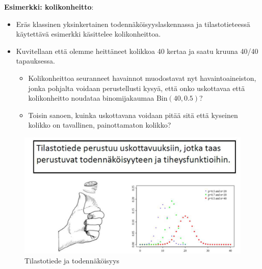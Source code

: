 \documentclass[
]{book}
\providecommand{\tightlist}{%
  \setlength{\itemsep}{0pt}\setlength{\parskip}{0pt}}
\begin{document}
\begin{eblock}{}

\textbf{Esimerkki: kolikonheitto}:

\begin{itemize}
\tightlist
\item
  Eräs klassinen yksinkertainen todennäköisyyslaskennassa ja tilastotieteessä käytettävä esimerkki käsittelee kolikonheittoa.
\item
  Kuvitellaan että olemme heittäneet kolikkoa 40 kertaa ja saatu kruuna 40/40 tapauksessa.

  \begin{itemize}
  \tightlist
  \item
    Kolikonheittoa seuranneet havainnot muodostavat nyt havaintoaineiston, jonka pohjalta voidaan perustellusti kysyä, että onko uskottavaa että kolikonheitto noudataa binomijakaumaa \(\text{Bin}(40, 0.5)\)?
  \item
    Toisin sanoen, kuinka uskottavana voidaan pitää sitä että kyseinen kolikko on tavallinen, painottamaton kolikko?
  \end{itemize}
\end{itemize}

\end{eblock}

\begin{figure}

{\centering \includegraphics[width=1\linewidth]{images/perustuu} 

}

\caption{Tilastotiede ja todennäköisyys}\label{fig:perus}
\end{figure}

\hfill\break
\hfill\break
\end{document}
